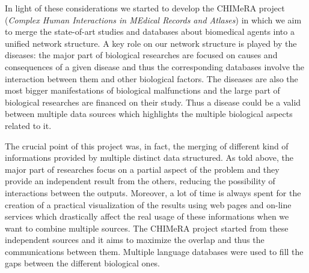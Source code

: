 \documentclass{standalone}
\begin{document}
In light of these considerations we started to develop the CHIMeRA project (\emph{Complex Human Interactions in MEdical Records and Atlases}) in which we aim to merge the state-of-art studies and databases about biomedical agents into a unified network structure.
A key role on our network structure is played by the diseases: the major part of biological researches are focused on causes and consequences of a given disease and thus the corresponding databases involve the interaction between them and other biological factors.
The diseases are also the most bigger manifestations of biological malfunctions and the large part of biological researches are financed on their study.
Thus a disease could be a valid  between multiple data sources which highlights the multiple biological aspects related to it.

The crucial point of this project was, in fact, the merging of different kind of informations provided by multiple distinct data structured.
As told above, the major part of researches focus on a partial aspect of the problem and they provide an independent result from the others, reducing the possibility of interactions between the outputs.
Moreover, a lot of time is always spent for the creation of a practical visualization of the results using web pages and on-line services which drastically affect the real usage of these informations when we want to combine multiple sources.
The CHIMeRA project started from these independent sources and it aims to maximize the overlap and thus the communications between them.
Multiple language databases were used to fill the gaps between the different biological ones.


\end{document}
